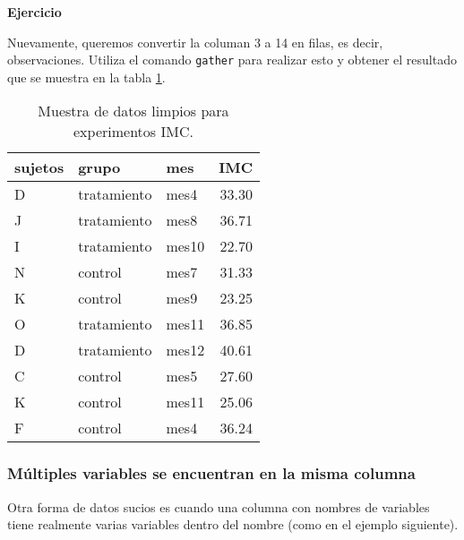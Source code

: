 \documentclass[]{article}
\begin{document}
\textbf{Ejercicio}

Nuevamente, queremos convertir la columan 3 a 14 en filas, es decir,
observaciones. Utiliza el comando \texttt{gather} para realizar esto y
obtener el resultado que se muestra en la tabla \ref{tab:sujetostidy}.

\begin{table}[ht]
\centering
\begin{tabular}{lllr}
  \hline
sujetos & grupo & mes & IMC \\ 
  \hline
D & tratamiento & mes4 & 33.30 \\ 
  J & tratamiento & mes8 & 36.71 \\ 
  I & tratamiento & mes10 & 22.70 \\ 
  N & control & mes7 & 31.33 \\ 
  K & control & mes9 & 23.25 \\ 
  O & tratamiento & mes11 & 36.85 \\ 
  D & tratamiento & mes12 & 40.61 \\ 
  C & control & mes5 & 27.60 \\ 
  K & control & mes11 & 25.06 \\ 
  F & control & mes4 & 36.24 \\ 
   \hline
\end{tabular}
\caption{Muestra de datos limpios para experimentos IMC.} 
\label{tab:sujetostidy}
\end{table}

\subsubsection{Múltiples variables se encuentran en la misma
columna}\label{multiples-variables-se-encuentran-en-la-misma-columna}

Otra forma de datos sucios es cuando una columna con nombres de
variables tiene realmente varias variables dentro del nombre (como en el
ejemplo siguiente).
\end{document}
